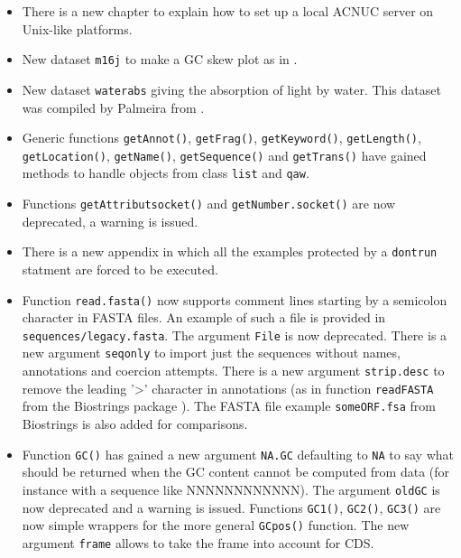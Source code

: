 \documentclass{article}
\begin{document}
\begin{itemize}

\item There is a new chapter to explain how to set up a
  local ACNUC server on Unix-like platforms.

\item New dataset \texttt{m16j} to make a GC skew plot as in
  \cite{LobryMBE96}.

\item New dataset \texttt{waterabs} giving the absorption of light 
  by water. This dataset was compiled by Palmeira \cite{PalmeiraL2007}
  from \cite{LitjensRA1999, QuickendenTI1980}.

\item Generic functions \texttt{getAnnot()}, \texttt{getFrag()},
  \texttt{getKeyword()}, \texttt{getLength()}, \texttt{getLocation()},
  \texttt{getName()}, \texttt{getSequence()} and \texttt{getTrans()}
  have gained methods to handle objects from class \texttt{list}
  and \texttt{qaw}.

\item Functions \texttt{getAttributsocket()} and \texttt{getNumber.socket()}
  are now deprecated, a warning is issued.

\item There is a new appendix in which all the examples protected
  by a \texttt{dontrun} statment are forced to be executed.

\item Function \texttt{read.fasta()} now supports comment lines
  starting by a semicolon character in FASTA files. An example
  of such a file is provided in \texttt{sequences/legacy.fasta}.
  The argument \texttt{File} is now deprecated. There is
  a new argument \texttt{seqonly} to import just the sequences
  without names, annotations and coercion attempts. There is
  a new argument \texttt{strip.desc} to remove the leading
  '>' character in annotations (as in function \texttt{readFASTA}
  from the Biostrings package \cite{Biostrings}). The FASTA file
  example \texttt{someORF.fsa} from Biostrings is also added
  for comparisons.

\item Function \texttt{GC()} has gained a new argument \texttt{NA.GC}
  defaulting to \texttt{NA} to say what should be returned when the
  GC content cannot be computed from data (for instance with a
  sequence like NNNNNNNNNNNN). The argument \texttt{oldGC} is now
  deprecated and a warning is issued. Functions \texttt{GC1()},
  \texttt{GC2()}, \texttt{GC3()} are now simple wrappers for the
  more general \texttt{GCpos()} function. The new argument \texttt{frame}
  allows to take the frame into account for CDS.


\end{itemize}
\end{document}
